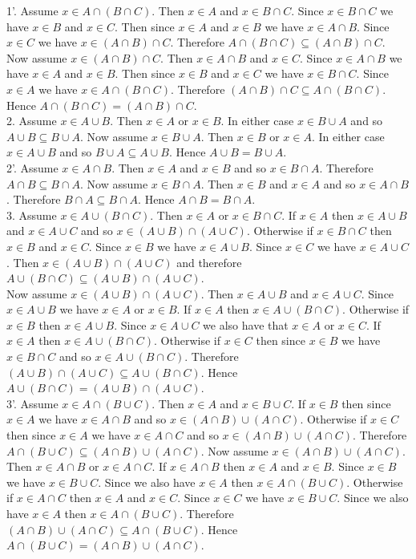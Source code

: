 \documentclass[12pt]{book}
\begin{document}
1'. Assume $x \in A \cap (B \cap C)$. Then $x \in A$ and $x \in B \cap C$. Since $x \in B \cap C$ we have $x \in B$ and $x \in C$. Then since $x \in A$ and $x \in B$ we have $x \in A \cap B$. Since $x \in C$ we have $x \in (A \cap B) \cap C$. Therefore $A \cap (B \cap C) \subseteq (A \cap B) \cap C$.\\ Now assume $x \in (A \cap B) \cap C$. Then $x \in A \cap B$ and $x \in C$. Since $x \in A \cap B$ we have $x \in A$ and $x \in B$. Then since $x \in B$ and $x \in C$ we have $x \in B \cap C$. Since $x \in A$ we have $x \in A \cap (B \cap C)$. Therefore $(A \cap B) \cap C \subseteq A \cap (B \cap C)$. Hence $A \cap (B \cap C) = (A \cap B) \cap C$.\\
2. Assume $x \in A \cup B$. Then $x \in A$ or $x \in B$. In either case $x \in B \cup A$ and so $A \cup B \subseteq B \cup A$. Now assume $x \in B \cup A$. Then $x \in B$ or $x \in A$. In either case $x \in A \cup B$ and so $B \cup A \subseteq A \cup B$. Hence $A \cup B = B \cup A$.\\
2'. Assume $x \in A \cap B$. Then $x \in A$ and $x \in B$ and so $x \in B \cap A$. Therefore $A \cap B \subseteq B \cap A$. Now assume $x \in B \cap A$. Then $x \in B$ and $x \in A$ and so $x \in A \cap B$. Therefore $B \cap A \subseteq B \cap A$. Hence $A \cap B = B \cap A$.\\
3. Assume $x \in A \cup (B \cap C)$. Then $x \in A$ or $x \in B \cap C$. If $x \in A$ then $x \in A \cup B$ and $x \in A \cup C$ and so $x \in (A \cup B) \cap (A \cup C)$. Otherwise if $x \in B \cap C$ then $x \in B$ and $x \in C$. Since $x \in B$ we have $x \in A \cup B$. Since $x \in C$ we have $x \in A \cup C$. Then $x \in (A \cup B) \cap (A \cup C)$ and therefore $A \cup (B \cap C) \subseteq (A \cup B) \cap (A \cup C)$.\\ Now assume $x \in (A \cup B) \cap (A \cup C)$. Then $x \in A \cup B$ and $x \in A \cup C$. Since $x \in A \cup B$ we have $x \in A$ or $x \in B$. If $x \in A$ then $x \in A \cup (B \cap C)$. Otherwise if $x \in B$ then $x \in A \cup B$. Since $x \in A \cup C$ we also have that $x \in A$ or $x \in C$. If $x \in A$ then $x \in A \cup (B \cap C)$. Otherwise if $x \in C$ then since $x \in B$ we have $x \in B \cap C$ and so $x \in A \cup (B \cap C)$. Therefore $(A \cup B) \cap (A \cup C) \subseteq A \cup (B \cap C)$. Hence $A \cup (B \cap C) = (A \cup B) \cap (A \cup C)$.\\
3'. Assume $x \in A \cap (B \cup C)$. Then $x \in A$ and $x \in B \cup C$. If $x \in B$ then since $x \in A$ we have $x \in A \cap B$ and so $x \in (A \cap B) \cup (A \cap C)$. Otherwise if $x \in C$ then since $x \in A$ we have $x \in A \cap C$ and so $x \in (A \cap B) \cup (A \cap C)$. Therefore $A \cap (B \cup C) \subseteq (A \cap B) \cup (A \cap C)$. Now assume $x \in (A \cap B) \cup (A \cap C)$. Then $x \in A \cap B$ or $x \in A \cap C$. If $x \in A \cap B$ then $x \in A$ and $x \in B$. Since $x \in B$ we have $x \in B \cup C$. Since we also have $x \in A$ then $x \in A \cap (B \cup C)$. Otherwise if $x \in A \cap C$ then $x \in A$ and $x \in C$. Since $x \in C$ we have $x \in B \cup C$. Since we also have $x \in A$ then $x \in A \cap (B \cup C)$. Therefore $(A \cap B) \cup (A \cap C) \subseteq A \cap (B \cup C)$. Hence $A \cap (B \cup C) = (A \cap B) \cup (A \cap C)$.\\
\end{document}
